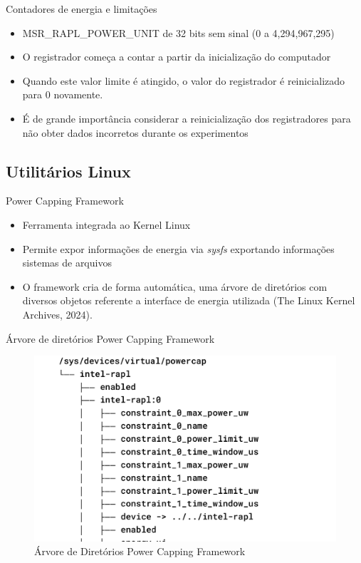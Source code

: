 \begin{frame}{Contadores de energia e limitações}
    \begin{itemize}
        \item MSR\_RAPL\_POWER\_UNIT de 32 bits sem sinal (0 a 4,294,967,295) 
        \item O registrador começa a contar a partir da inicialização do computador
        \item Quando este valor limite é atingido, o valor do registrador é reinicializado para 0 novamente.
        \item É de grande importância considerar a reinicialização
        dos registradores para não obter dados incorretos durante os experimentos
    \end{itemize}
\end{frame}

\subsection{Utilitários Linux}
\begin{frame}{Power Capping Framework}
    \begin{itemize}
        \item Ferramenta integrada ao Kernel Linux
        \item Permite expor informações de energia via \emph{sysfs} exportando informações sistemas de arquivos
        \item O framework cria de forma automática, uma árvore de diretórios com
        diversos objetos referente a interface de energia utilizada (The Linux Kernel Archives, 2024).
    \end{itemize}
\end{frame}

\begin{frame}{Árvore de diretórios Power Capping Framework}
    \begin{figure}
        \centering
        \includegraphics[width=0.65\linewidth]{images/powercap-tree.png}
        \caption{Árvore de Diretórios Power Capping Framework}
        \label{fig:powercap-tree}
    \end{figure}
\end{frame}

